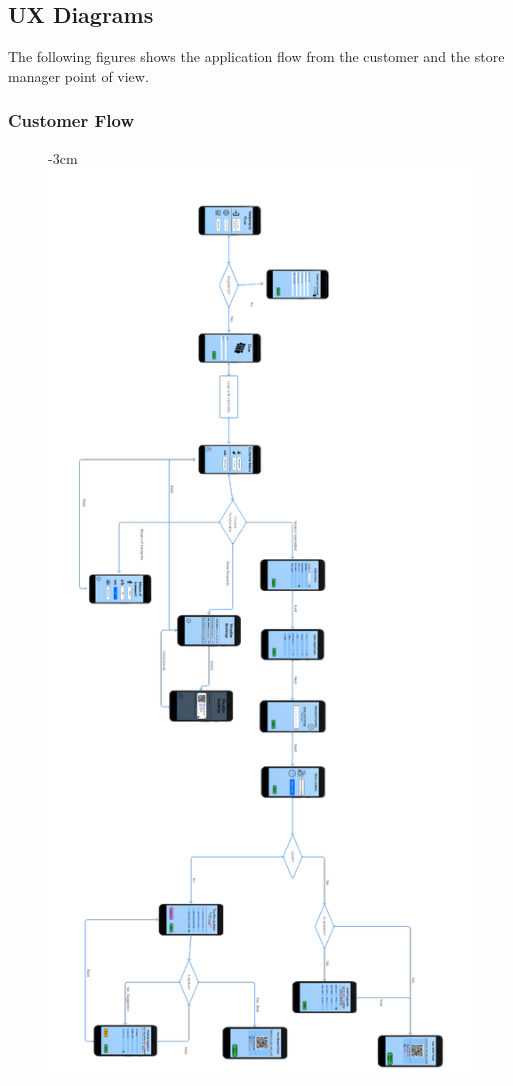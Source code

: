 \documentclass{article}
\begin{document}
	\subsection{UX Diagrams}
	The following figures shows the application flow from the customer and the store manager point of view.
	
	\newpage
	
		\subsubsection{Customer Flow}
			\begin{figure}[H]
				\begin{adjustwidth} {-3cm}{}
					\centering
					\includegraphics[scale=0.7, angle=180, trim= 0 0 0 -5cm]{../Mockups/UXDiagrams/CustomerFlow.pdf} \\

\end{adjustwidth}
\end{figure}
\end{document}
